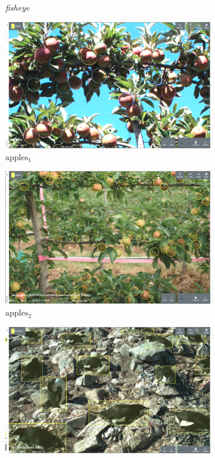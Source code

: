 \documentclass[conference]{IEEEtran}
\begin{document}
\begin{figure}[htb]
\begin{subfigure}[t]{0.2\linewidth}
  \caption{\emph{fisheye}}
\end{subfigure}%
\begin{subfigure}[t]{0.2\linewidth}
  \includegraphics[width=0.9\linewidth]{figures/images/apples_big2.png}
  \caption{$\mathrm{apples_1}$}
\end{subfigure}%
\begin{subfigure}[t]{0.2\linewidth}
  \includegraphics[width=0.9\linewidth]{figures/images/apples2.png}
  \caption{$\mathrm{apples_2}$}
\end{subfigure}
\begin{subfigure}[t]{0.2\linewidth}
  \includegraphics[width=0.9\linewidth]{figures/images/penguins2.png}

\end{subfigure}
\end{figure}
\end{document}
